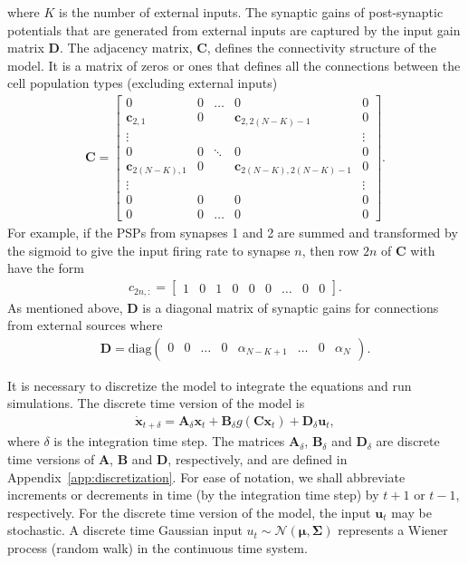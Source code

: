 \documentclass{article}
\begin{document}
where $K$ is the number of external inputs. The synaptic gains of post-synaptic potentials that are generated from external inputs are captured by the input gain matrix $\mathbf{D}$. The adjacency matrix, $\mathbf{C}$, defines the connectivity structure of the model. It is a matrix of zeros or ones that defines all the connections between the cell population types (excluding external inputs) 
\begin{align}
	\mathbf{C} = \begin{bmatrix} 0 & 0 & \hdots & 0 & 0 \\
	\mathbf{c}_{2,1} & 0 &  & \mathbf{c}_{2,2(N-K)-1} & 0 \\ 
	\vdots & &  & & \vdots \\
	0 & 0 & \ddots & 0 & 0 \\
 	\mathbf{c}_{2(N-K),1} & 0 &  & \mathbf{c}_{2(N-K),2(N-K)-1} & 0 \\
	\vdots & & & & \vdots \\
	0 & 0 & & 0 & 0 \\
	0 & 0 & \hdots & 0 & 0 \end{bmatrix}. 
\end{align}
For example, if the PSPs from synapses 1 and 2 are summed and transformed by the sigmoid to give the input firing rate to synapse $n$, then row $2n$ of $\mathbf{C}$ with have the form
\begin{align}
	c_{2n,:} = \begin{bmatrix} 1 & 0 & 1 & 0 & 0 & 0 & \hdots & 0 & 0 \end{bmatrix}.
\end{align}
As mentioned above, $\mathbf{D}$ is a diagonal matrix of synaptic gains for connections from external sources where
\begin{align}
	\mathbf{D} = \mathrm{diag} \left(\begin{array}{cccccccc}0 & 0 & \hdots & 0 & \alpha_{N-K+1} & \hdots & 0 & \alpha_N\end{array}\right).
\end{align}

It is necessary to discretize the model to integrate the equations and run simulations. The discrete time version of the model is 
\begin{align}
	\dot{\mathbf{x}}_{t+\delta} = \mathbf{A}_{\delta}\mathbf{x}_t + \mathbf{B}_{\delta} g\left(\mathbf{C}\mathbf{x}_t\right) + \mathbf{D}_{\delta}\mathbf{u}_t,
\end{align}
where $\delta$ is the integration time step. The matrices $\mathbf{A}_{\delta}$, $\mathbf{B}_{\delta}$ and $\mathbf{D}_{\delta}$ are discrete time versions of $\mathbf{A}$, $\mathbf{B}$ and $\mathbf{D}$, respectively, and are defined in Appendix~\ref{app:discretization}. For ease of notation, we shall abbreviate increments or decrements in time (by the integration time step) by $t+1$ or $t-1$, respectively. For the discrete time version of the model, the input $\mathbf{u}_t$ may be stochastic. A discrete time Gaussian input $u_t\sim\mathcal{N}(\boldsymbol{\mu},\boldsymbol{\Sigma})$ represents a Wiener process (random walk) in the continuous time system. 
\end{document}
